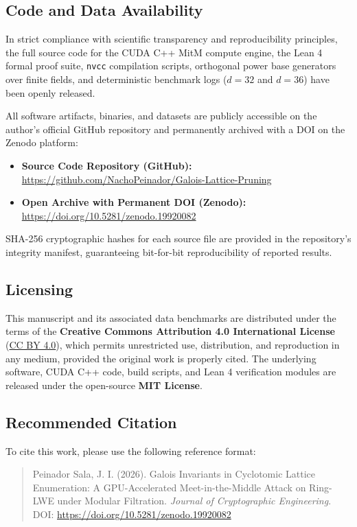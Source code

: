 \documentclass[11pt,a4paper]{article}
\theoremstyle{plain}
\theoremstyle{definition}
\numberwithin{equation}{section}
\begin{document}
\subsection*{Code and Data Availability}
In strict compliance with scientific transparency and reproducibility principles, the full source code for the CUDA C++ MitM compute engine, the Lean 4 formal proof suite, \texttt{nvcc} compilation scripts, orthogonal power base generators over finite fields, and deterministic benchmark logs ($d=32$ and $d=36$) have been openly released.

All software artifacts, binaries, and datasets are publicly accessible on the author's official GitHub repository and permanently archived with a DOI on the Zenodo platform:
\begin{itemize}
    \item \textbf{Source Code Repository (GitHub):}\\ \url{https://github.com/NachoPeinador/Galois-Lattice-Pruning}
    \item \textbf{Open Archive with Permanent DOI (Zenodo):}\\ \url{https://doi.org/10.5281/zenodo.19920082}
\end{itemize}
SHA-256 cryptographic hashes for each source file are provided in the repository's integrity manifest, guaranteeing bit-for-bit reproducibility of reported results.

\subsection*{Licensing}
This manuscript and its associated data benchmarks are distributed under the terms of the \textbf{Creative Commons Attribution 4.0 International License} (\href{https://creativecommons.org/licenses/by/4.0/}{CC BY 4.0}), which permits unrestricted use, distribution, and reproduction in any medium, provided the original work is properly cited. The underlying software, CUDA C++ code, build scripts, and Lean 4 verification modules are released under the open-source \textbf{MIT License}.

\subsection*{Recommended Citation}
To cite this work, please use the following reference format:
\begin{quote}
\small
Peinador Sala, J. I. (2026). Galois Invariants in Cyclotomic Lattice Enumeration: A GPU-Accelerated Meet-in-the-Middle Attack on Ring-LWE under Modular Filtration. \emph{Journal of Cryptographic Engineering}. DOI: \url{https://doi.org/10.5281/zenodo.19920082}
\end{quote}
\end{document}
